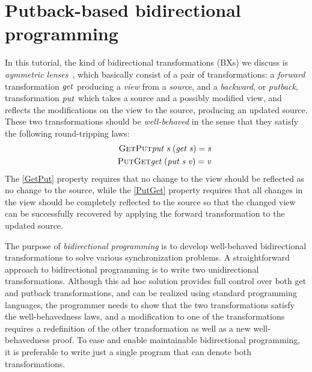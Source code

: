 













\section{Putback-based bidirectional programming}
\label{sec:PutBX}

In this tutorial, the kind of bidirectional transformations (BXs) we discuss is \emph{aymmetric lenses}~\cite{Lenses},
which basically consist of a pair of transformations:
a {\em forward} transformation \ensuremath{\Varid{get}} producing a \emph{view} from a \emph{source}, and a {\em backward}, or {\em putback},
transformation \ensuremath{\Varid{put}} which takes a source and a possibly modified view, and reflects the modifications on the view to the source, producing an updated source.
These two transformations should be {\em
well-behaved} in the sense that they satisfy the following
round-tripping laws:
\begin{align*}
\tag*{\textsc{GetPut}}
\label{GetPut}
\ensuremath{\Varid{put}\;\Varid{s}\;(\Varid{get}\;\Varid{s})\mathrel{=}\Varid{s}}\\
\tag*{\textsc{PutGet}}
\label{PutGet}
\ensuremath{\Varid{get}\;(\Varid{put}\;\Varid{s}\;\Varid{v})\mathrel{=}\Varid{v}}
\end{align*}
The \ref{GetPut} property requires that no change to the view should
be reflected as no change to the source, while the \ref{PutGet}
property requires that all changes in the view should be completely reflected
to the source so that the changed view can be successfully recovered by
applying the forward transformation to the updated source.

The purpose of {\em bidirectional programming} is to develop well-behaved
bidirectional transformations to solve various synchronization
problems.  A straightforward approach to bidirectional programming is
to write two unidirectional transformations. Although this ad hoc
solution provides full control over both get and putback
transformations, and can be realized using standard programming
languages, the programmer needs to show that the two transformations
satisfy the well-behavedness laws, and a modification to one of the
transformations requires a redefinition of the other transformation as
well as a new well-behavedness proof.
To ease and enable maintainable bidirectional programming, it is
preferable to write just a single program that can denote both
transformations.

